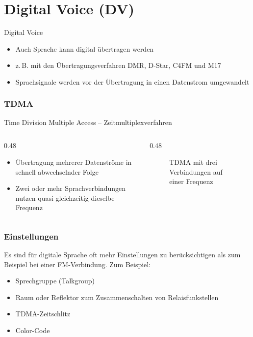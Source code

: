 
\section{Digital Voice (DV)}
\label{section:digital_voice}
\begin{frame}{Digital Voice}
\begin{itemize}
  \item Auch Sprache kann digital übertragen werden
  \item z.\,B. mit den Übertragungsverfahren DMR, D-Star, C4FM und M17
  \item Sprachsignale werden vor der Übertragung in einen Datenstrom umgewandelt
  \end{itemize}
\end{frame}

\begin{frame}
\frametitle{TDMA}
Time Division Multiple Access -- Zeitmultiplexverfahren
\begin{columns}
    \begin{column}{0.48\textwidth}
    \begin{itemize}
  \item Übertragung mehrerer Datenströme in schnell abwechselnder Folge
  \item Zwei oder mehr Sprachverbindungen nutzen quasi gleichzeitig dieselbe Frequenz
  \end{itemize}

    \end{column}
   \begin{column}{0.48\textwidth}
       
\begin{figure}
    \caption{\scriptsize TDMA mit drei Verbindungen auf einer Frequenz}
    \label{n_digital_voice_tdma}
\end{figure}


   \end{column}
\end{columns}

\end{frame}

\begin{frame}
\frametitle{Einstellungen}
Es sind für digitale Sprache oft mehr Einstellungen zu berücksichtigen als zum Beispiel bei einer FM-Verbindung. Zum Beispiel:

\begin{itemize}
  \item Sprechgruppe (Talkgroup)
  \item Raum oder Reflektor zum Zusammenschalten von Relaisfunkstellen
  \item TDMA-Zeitschlitz
  \item Color-Code
  \end{itemize}
\end{frame}

